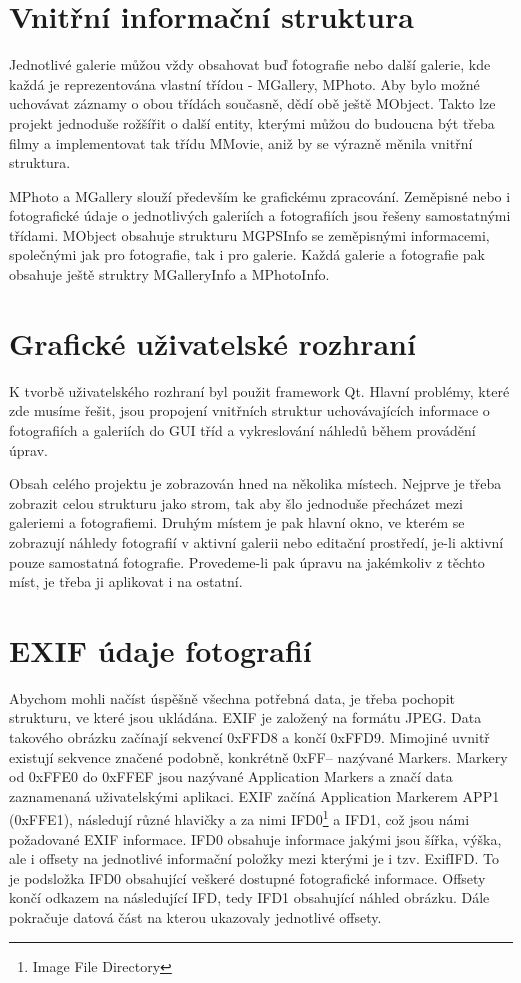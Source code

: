\documentclass[11pt,twoside,a4paper]{book}
\begin{document}
\section{Vnitřní informační struktura}
\noindent
Jednotlivé galerie můžou vždy obsahovat buď fotografie nebo další galerie, kde každá je reprezentována vlastní třídou - MGallery, MPhoto. Aby bylo možné uchovávat záznamy o obou třídách současně, dědí obě ještě MObject. Takto lze projekt jednoduše rožšířit o další entity, kterými můžou do budoucna být třeba filmy a implementovat tak třídu MMovie, aniž by se výrazně měnila vnitřní struktura.

MPhoto a MGallery slouží především ke grafickému zpracování. Zeměpisné nebo i fotografické údaje o jednotlivých galeriích a fotografiích jsou řešeny samostatnými třídami. MObject obsahuje strukturu MGPSInfo se zeměpisnými informacemi, společnými jak pro fotografie, tak i pro galerie. Každá galerie a fotografie pak obsahuje ještě struktry MGalleryInfo a MPhotoInfo.

\section{Grafické uživatelské rozhraní}
\noindent
K tvorbě uživatelského rozhraní byl použit framework Qt. Hlavní problémy, které zde musíme řešit, jsou propojení vnitřních struktur uchovávajících informace o fotografiích a galeriích do GUI tříd a vykreslování náhledů během provádění úprav.

\indent
Obsah celého projektu je zobrazován hned na několika místech. Nejprve je třeba zobrazit celou strukturu jako strom, tak aby šlo jednoduše přecházet mezi galeriemi a fotografiemi. Druhým místem je pak hlavní okno, ve kterém se zobrazují náhledy fotografií v aktivní galerii nebo editační prostředí, je-li aktivní pouze samostatná fotografie. Provedeme-li pak úpravu na jakémkoliv z těchto míst, je třeba ji aplikovat i na ostatní.

\section{EXIF údaje fotografií}
\indent
Abychom mohli načíst úspěšně všechna potřebná data, je třeba pochopit strukturu, ve které jsou ukládána. EXIF je založený na formátu JPEG. Data takového obrázku začínají sekvencí 0xFFD8 a končí 0xFFD9. Mimojiné uvnitř existují sekvence značené podobně, konkrétně 0xFF-- nazývané Markers. Markery od 0xFFE0 do  0xFFEF jsou nazývané Application Markers a značí data zaznamenaná uživatelskými aplikaci. EXIF začíná Application Markerem APP1 (0xFFE1), následují různé hlavičky a za nimi IFD0\footnote{Image File Directory} a IFD1, což jsou námi požadované EXIF informace. IFD0 obsahuje informace jakými jsou šířka, výška, ale i offsety na jednotlivé informační položky mezi kterými je i tzv. ExifIFD. To je podsložka IFD0 obsahující veškeré dostupné fotografické informace. Offsety končí odkazem na následující IFD, tedy IFD1 obsahující náhled obrázku. Dále pokračuje datová část na kterou ukazovaly jednotlivé offsety.
\end{document}
